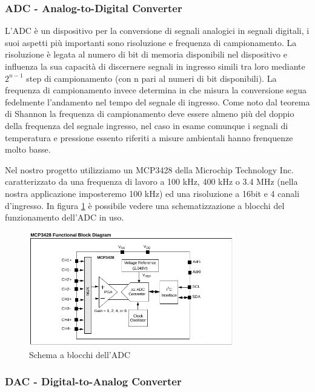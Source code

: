 \documentclass[10pt]{article}
\begin{document}
		\subsubsection{ADC - Analog-to-Digital Converter}\label{sec:adc}
		L'ADC è un dispositivo per la conversione di segnali analogici in segnali digitali, i suoi aspetti più importanti sono risoluzione e frequenza di campionamento.
		La risoluzione è legata al numero di bit di memoria disponibili nel dispositivo e influenza la sua capacità di discernere segnali in ingresso simili tra loro mediante $2^{n-1}$ step di campionamento (con n pari al numeri di bit disponibili). La frequenza di campionamento invece determina in che misura la conversione segua fedelmente l'andamento nel tempo del segnale di ingresso. Come noto dal teorema di Shannon la frequenza di campionamento deve essere almeno più del doppio della frequenza del segnale ingresso, nel caso in esame comunque i segnali di temperatura e pressione essento riferiti a misure ambientali hanno frenquenze molto basse.

		Nel nostro progetto utilizziamo un MCP3428 della Microchip Technology Inc. caratterizzato da una frequenza di lavoro a 100 kHz, 400 kHz o 3.4 MHz (nella nostra applicazione imposteremo 100 kHz) ed una risoluzione a 16bit e 4 canali d'ingresso. In figura \ref{fig:adc} è possibile vedere una schematizzazione a blocchi del funzionamento dell'ADC in uso.
		\begin{figure}[h]
		\centering
		\includegraphics[width=0.8\textwidth]{src/adc_block}
		\caption{Schema a blocchi dell'ADC}\label{fig:adc}
		\end{figure}
		\subsubsection{DAC - Digital-to-Analog Converter}\label{sec:dac}
\end{document}
